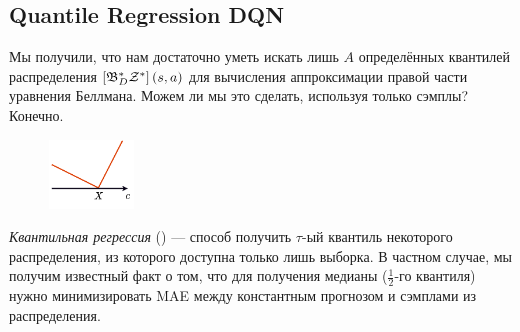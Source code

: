 



\subsection{Quantile Regression DQN}\label{subsec:qrdqn}

Мы получили, что нам достаточно уметь искать лишь $A$ определённых квантилей распределения $\left[ \mathfrak{B}^*_D \mathcal{Z}^* \right](s, a)$ для вычисления аппроксимации правой части уравнения Беллмана. Можем ли мы это сделать, используя только сэмплы? Конечно. 

\begin{figure}
\vspace{-0.75cm}
\centering
\includegraphics[width=0.2\textwidth]{Images/quantileloss.png}
\vspace{-1.75cm}
\end{figure}
\emph{Квантильная регрессия} () --- способ получить $\tau$-ый квантиль некоторого распределения, из которого доступна только лишь выборка. В частном случае, мы получим известный факт о том, что для получения медианы ($\frac{1}{2}$-го квантиля) нужно минимизировать MAE между константным прогнозом и сэмплами из распределения.

